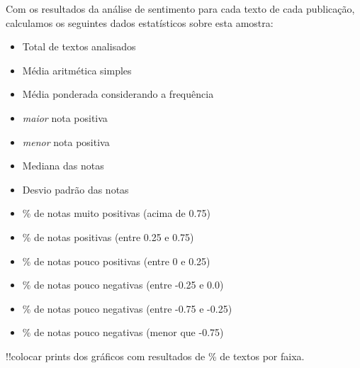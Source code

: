 Com os resultados da análise de sentimento para cada texto de cada publicação, calculamos os seguintes dados estatísticos sobre esta amostra:
\begin{itemize}
    \item Total de textos analisados
    \item Média aritmética simples
    \item Média ponderada considerando a frequência
    \item \textit{maior} nota positiva
    \item \textit{menor} nota positiva
    \item Mediana das notas
    \item Desvio padrão das notas
    \item \% de notas muito positivas (acima de 0.75)
    \item \% de notas positivas (entre 0.25 e 0.75)
    \item \% de notas pouco positivas (entre 0 e 0.25)
    \item \% de notas pouco negativas (entre -0.25 e 0.0)
    \item \% de notas pouco negativas (entre -0.75 e -0.25)
    \item \% de notas pouco negativas (menor que -0.75)
\end{itemize}

!!colocar prints dos gráficos com resultados de \% de textos por faixa.

